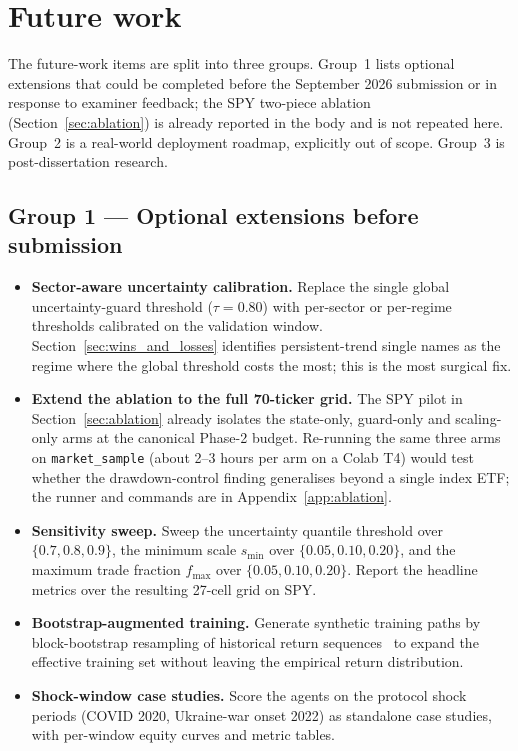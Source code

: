 \section{Future work}
\label{sec:future_work}

The future-work items are split into three groups. Group~1 lists optional extensions that could be completed before the September 2026 submission or in response to examiner feedback; the SPY two-piece ablation (Section~\ref{sec:ablation}) is already reported in the body and is not repeated here. Group~2 is a real-world deployment roadmap, explicitly out of scope. Group~3 is post-dissertation research.

\subsection{Group 1 --- Optional extensions before submission}
\label{sec:group_1_scheduled}

\begin{itemize}[leftmargin=*]
  \item \textbf{Sector-aware uncertainty calibration.} Replace the single global uncertainty-guard threshold ($\tau = 0.80$) with per-sector or per-regime thresholds calibrated on the validation window. Section~\ref{sec:wins_and_losses} identifies persistent-trend single names as the regime where the global threshold costs the most; this is the most surgical fix.

  \item \textbf{Extend the ablation to the full 70-ticker grid.} The SPY pilot in Section~\ref{sec:ablation} already isolates the state-only, guard-only and scaling-only arms at the canonical Phase-2 budget. Re-running the same three arms on \texttt{market\_sample} (about 2--3 hours per arm on a Colab T4) would test whether the drawdown-control finding generalises beyond a single index ETF; the runner and commands are in Appendix~\ref{app:ablation}.

  \item \textbf{Sensitivity sweep.} Sweep the uncertainty quantile threshold over $\{0.7, 0.8, 0.9\}$, the minimum scale $s_{\min}$ over $\{0.05, 0.10, 0.20\}$, and the maximum trade fraction $f_{\max}$ over $\{0.05, 0.10, 0.20\}$. Report the headline metrics over the resulting 27-cell grid on SPY.

  \item \textbf{Bootstrap-augmented training.} Generate synthetic training paths by block-bootstrap resampling of historical return sequences~\parencite{politis1994stationary} to expand the effective training set without leaving the empirical return distribution.

  \item \textbf{Shock-window case studies.} Score the agents on the protocol shock periods (COVID 2020, Ukraine-war onset 2022) as standalone case studies, with per-window equity curves and metric tables.
\end{itemize}

